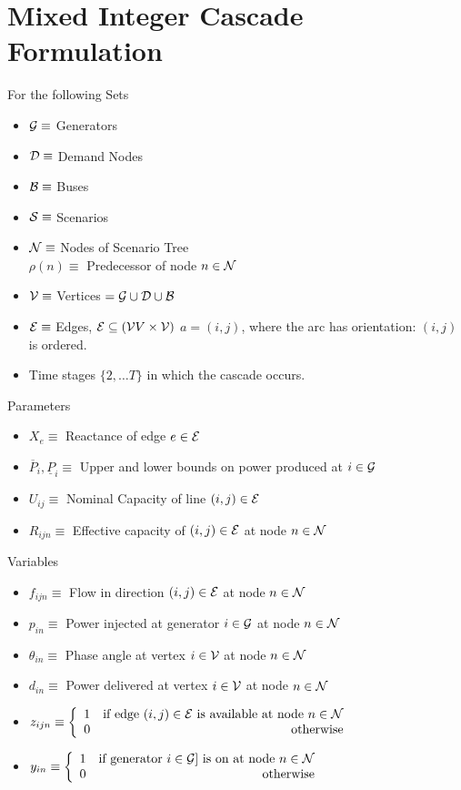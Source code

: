 \section{Mixed Integer Cascade Formulation}

For the following Sets
\begin{itemize}
\item $ \mathcal{G} \equiv $ Generators 
\item $ \mathcal{D} \equiv $ Demand Nodes 
\item $ \mathcal{B} \equiv $ Buses 
\item $ \mathcal{S} \equiv $ Scenarios 
\item $ \mathcal{N} \equiv $ Nodes of Scenario Tree\\
	$\rho \left( n \right) \equiv $ Predecessor of node $ n \in \mathcal{N} $
\item $ \mathcal{V} \equiv $ Vertices $ = \mathcal{G} \cup \mathcal{D} \cup \mathcal{B} $
\item $ \mathcal{E} \equiv $ Edges, $ \mathcal{E} \subseteq (\mathcal{V}{V} \times \mathcal{V} )$\newline
	$  a = ( i , j )  $,  where the arc has orientation: $(i,j)$ is ordered. 
\item Time stages $\{2,\ldots T\}$ in which the cascade occurs.
\end{itemize}

Parameters

\begin{itemize}
\item $X_e \equiv $ Reactance of edge $e \in \mathcal{E}$
\item $ \overline{P}_i, \underline{P}_i \equiv $ Upper and lower bounds on power produced at $ i \in \mathcal{G} $
\item $ U_{ij} \equiv$ Nominal Capacity of line $(i,j) \in \mathcal{E}$
\item $ R_{ijn} \equiv$  Effective capacity of $(i,j) \in \mathcal{E}$ at node $n \in \mathcal{N}$
\end{itemize}


Variables

\begin{itemize}
\item $f_{ijn} \equiv $ Flow in direction $(i,j) \in \mathcal{E}$ at node $ n \in \mathcal{N} $
\item $p_{in} \equiv $ Power injected at generator $i \in \mathcal{G}$ at node $n \in \mathcal{N}$
\item $\theta_{in} \equiv $ Phase angle at vertex $i \in \mathcal{V}$ at node $n \in \mathcal{N}$
\item $d_{in} \equiv $ Power delivered at vertex $i \in \mathcal{V}$ at node $n \in \mathcal{N}$
\item $z_{ijn} \equiv  
	\left\{ 
	\begin{array}{lr}
			1 & \mbox{if edge } (i,j) \in \mathcal{E} \mbox{ is available at node } n \in \mathcal{N}\\
			 0 & \mbox{otherwise}
	\end{array}
	\right.$
\item $y_{in} \equiv  
	\left\{ 
	\begin{array}{lr}
			1 & \mbox{if generator } i \in \mathcal{G}] \mbox{ is on at node } n \in \mathcal{N}\\
			 0 & \mbox{otherwise}
	\end{array}
	\right.$
\end{itemize}

